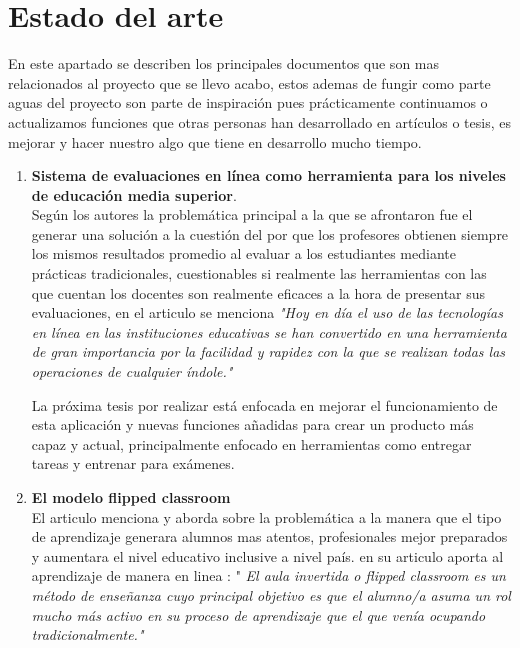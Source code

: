 \documentclass[12pt]{book}
\begin{document}
	\section{Estado del arte}
        {\normalsize En este apartado se describen los principales documentos que son mas relacionados al proyecto que se llevo acabo, estos ademas de fungir como parte aguas del proyecto son parte de inspiración pues prácticamente continuamos o actualizamos funciones que otras personas han desarrollado en artículos o tesis, es mejorar y hacer nuestro algo que tiene en desarrollo mucho tiempo. }
	\begin{enumerate}
		
		\item \textbf{Sistema de evaluaciones
		en línea como herramienta para los niveles de
		educación media superior}.\\
		{\normalsize Según los autores la problemática principal a la que se afrontaron fue el generar una solución a la cuestión del por que los profesores obtienen siempre los mismos resultados promedio al evaluar a los estudiantes mediante prácticas tradicionales, cuestionables si realmente las herramientas con las que cuentan los docentes son realmente eficaces a la hora de presentar sus evaluaciones, en el articulo \cite{brambila2015sistema} se menciona \textit{"Hoy  en día el  uso  de  las  tecnologías en  línea  en  las  instituciones  educativas  se han convertido en una herramienta de gran importancia por la facilidad y rapidez con la que se realizan  todas  las  operaciones  de  cualquier índole."}}	
         
         {\normalsize La próxima tesis por realizar está enfocada en mejorar el funcionamiento de esta aplicación y nuevas funciones añadidas para crear un producto más capaz y actual, principalmente enfocado en herramientas como entregar tareas y entrenar para exámenes.}
	
	    \item \textbf{El modelo flipped classroom \\}
	    {\normalsize El articulo menciona y aborda sobre la problemática a la manera que el tipo de aprendizaje generara alumnos mas atentos, profesionales mejor preparados y aumentara el nivel educativo inclusive a nivel país. \cite{aguilera2017modelo} en su articulo aporta al aprendizaje de manera en linea : " \textit{El aula invertida o flipped classroom es un método de enseñanza cuyo principal objetivo es que el alumno/a asuma un rol mucho más activo en su proceso de aprendizaje que el que venía ocupando tradicionalmente." }} 
	    

\end{enumerate}
\end{document}
